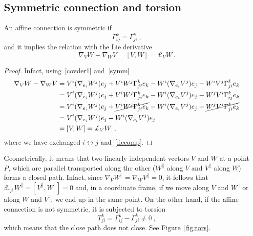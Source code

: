 \subsection{Symmetric connection and torsion}

    An affine connection is symmetric if 
    \begin{equation}\label{symm}
        \Gamma^k_{ij} = \Gamma^k_{ji}  ~,
    \end{equation}
    and it implies the relation with the Lie derivative
    \begin{equation*}
        \nabla_V W - \nabla_W V = [V, W] = \pounds_V W ~.
    \end{equation*}
    \begin{proof}
        Infact, using~\eqref{covder1} and~\eqref{symm}
        \begin{equation*}
        \begin{aligned}
            \nabla_V W - \nabla_W V & = V^i (\nabla_{e_i} W^j) e_j + V^i W^j \Gamma^k_{ji} e_k - W^i (\nabla_{e_i} V^j) e_j - W^i V^j \Gamma^k_{ji} e_k \\ & = V^i (\nabla_{e_i} W^j) e_j + V^i W^j \Gamma^k_{ji} e_k - W^i (\nabla_{e_i} V^j) e_j - W^j V^i \Gamma^k_{ij} e_k \\ & = V^i (\nabla_{e_i} W^j) e_j + \cancel{V^i W^j \Gamma^k_{ji} e_k} - W^i (\nabla_{e_i} V^j) e_j - \cancel{W^j V^i \Gamma^k_{ji} e_k} \\ & = V^i (\nabla_{e_i} W^j) e_j - W^i (\nabla_{e_i} V^j) e_j \\ & = [V, W] = \pounds_V W ~,
        \end{aligned}
        \end{equation*}
        where we have exchanged $i \leftrightarrow j$ and~\eqref{liecomp}.
    \end{proof}

    Geometrically, it means that two linearly independent vectors $V$ and $W$ at a point $P$, which are parallel transported along the other ($W^\parallel$ along $V$ and $V^\parallel$ along $W$) forms a closed path. Infact, since $\nabla_V W^\parallel = \nabla_W V^\parallel = 0$, it follows that $\pounds_{V^\parallel} W^\parallel = [V^\parallel, W^\parallel] = 0$ and, in a coordinate frame, if we move along $V$ and $W^\parallel$ or along $W$ and $V^\parallel$, we end up in the same point. On the other hand, if the affine connection is not symmetric, it is subjected to torsion 
    \begin{equation*}
        T^k_{ji} = \Gamma^k_{ij} - \Gamma^k_{ji} \neq 0 ~,
    \end{equation*}
    which means that the close path does not close. See Figure~\ref{fig:tors}.

